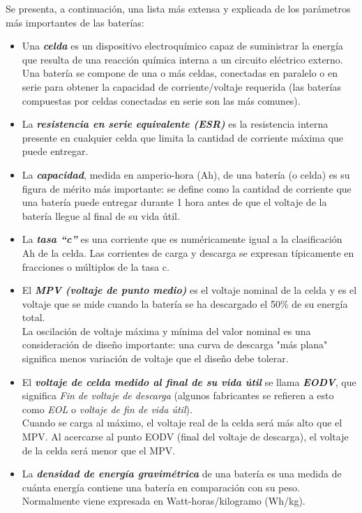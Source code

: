 \documentclass[12pt]{article}
\begin{document}
	\noindent Se presenta, a continuación, una lista más extensa y explicada de los parámetros más importantes de las baterías: 
	
	\begin{itemize}
		\item  Una \textit{\textbf{celda}} es un dispositivo electroquímico capaz de suministrar la energía que resulta de una reacción química interna a un circuito eléctrico externo. \\
		Una batería se compone de una o más celdas, conectadas en paralelo o en serie para obtener la capacidad de corriente/voltaje requerida (las baterías compuestas por celdas conectadas en serie son las más comunes).
		\item La \textit{\textbf{resistencia en serie equivalente (ESR)}} es la resistencia interna presente en cualquier celda que limita la cantidad de corriente máxima que puede entregar.
		\item La \textit{\textbf{capacidad}}, medida en amperio-hora (Ah), de una batería (o celda) es su figura de mérito más importante: se define como la cantidad de corriente que una batería puede entregar durante 1 hora antes de que el voltaje de la batería llegue al final de su vida útil. 
 		\item La \textit{\textbf{tasa ``c''}}  es una corriente que es numéricamente igual a la clasificación Ah de la celda. Las corrientes de carga y descarga se expresan típicamente en fracciones o múltiplos de la tasa c. 
 		\item El \textit{\textbf{MPV (voltaje de punto medio)}} es el voltaje nominal de la celda y es el voltaje que se mide cuando la batería se ha descargado el 50\% de su energía total. \\
 		\noindent La oscilación de voltaje máxima y mínima del valor nominal es una consideración de diseño importante: una curva de descarga "más plana" significa menos variación de voltaje que el diseño debe tolerar.
 		\item El \textit{\textbf{voltaje de celda medido al final de su vida útil}} se llama \textit{\textbf{EODV}}, que significa \textit{Fin de voltaje de descarga} (algunos fabricantes se refieren a esto como \textit{EOL} o \textit{voltaje de fin de vida útil}). \\
 		\noindent Cuando se carga al máximo, el voltaje real de la celda será más alto que el MPV. Al acercarse al punto EODV (final del voltaje de descarga), el voltaje de la celda será menor que el MPV. 
 		\item La \textit{\textbf{densidad de energía gravimétrica}} de una batería es una medida de cuánta energía contiene una batería en comparación con su peso. Normalmente viene expresada en Watt-horas/kilogramo (Wh/kg).

\end{itemize}
\end{document}
